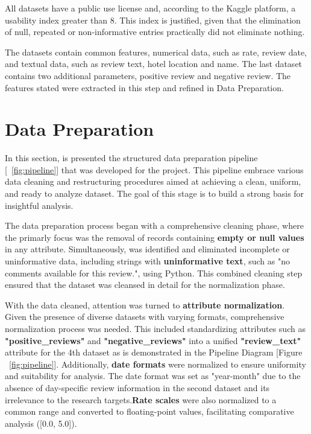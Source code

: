 \documentclass[sigconf]{acmart}
\begin{document}
All datasets have a public use license and, according to the Kaggle platform, a usability index greater than 8. This index is justified, given that the elimination of null, repeated or non-informative entries practically did not eliminate nothing.

The datasets contain common features, numerical data, such as rate, review date, and textual data, such as review text, hotel location and name. The last dataset contains two additional parameters, positive review and negative review. The features stated were extracted in this step and refined in Data Preparation.


\section{Data Preparation}

In this section, is presented the structured data preparation pipeline [~\ref{fig:pipeline}] that was developed for the project. This pipeline embrace various data cleaning and restructuring procedures aimed at achieving a clean, uniform, and ready to analyze dataset. The goal of this stage is to build a strong basis for insightful analysis.

The data preparation process began with a comprehensive cleaning phase, where the primarly focus was the removal of records containing \textbf{empty or null values} in any attribute. Simultaneously, was identified and eliminated incomplete or uninformative data, including strings with \textbf{uninformative text}, such as "no comments available for this review.", using Python. This combined cleaning step ensured that the dataset was cleansed in detail for the normalization phase.

With the data cleaned, attention was turned to \textbf{attribute normalization}. Given the presence of diverse datasets with varying formats, comprehensive normalization process was needed. This included standardizing attributes such as \textbf{"positive\_reviews"} and \textbf{"negative\_reviews"} into a unified \textbf{"review\_text"} attribute for the 4th dataset as is demonstrated in the Pipeline Diagram [Figure ~\ref{fig:pipeline}]. Additionally, \textbf{date formats} were normalized to ensure uniformity and suitability for analysis. The date format was set as "year-month" due to the absence of day-specific review information in the second dataset and its irrelevance to the research targets.\textbf{Rate scales} were also normalized to a common range and converted to floating-point values, facilitating comparative analysis ([0.0, 5.0]).
\end{document}
